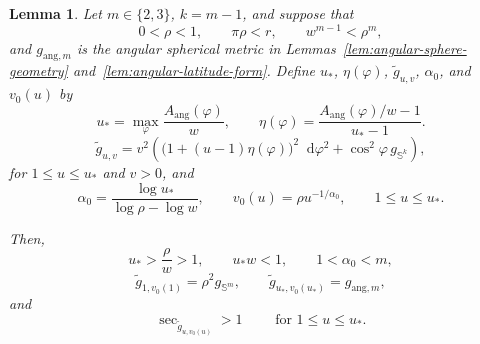 \documentclass[11pt,reqno]{amsart}
\newtheorem{lemma}[theorem]{Lemma}
\theoremstyle{definition}
\numberwithin{equation}{section}
\newcommand{\dd}{\mathop{}\!\mathrm d}
\begin{document}
\begin{lemma}\label{lem:angular-slice-interpolation}
Let \(m\in\{2,3\}\), \(k=m-1\), and suppose that
\[
 0<\rho<1,\qquad \pi\rho<r,\qquad
 w^{m-1}<\rho^m,
\]
and \(g_{\mathrm{ang},m}\) is the angular spherical metric in
Lemmas~\ref{lem:angular-sphere-geometry}
and~\ref{lem:angular-latitude-form}.  Define \(u_*\), \(\eta(\varphi)\),
\(\widetilde g_{u,v}\), $\alpha_0$, and \(v_0(u)\) by
\begin{equation}
u_*=\max_\varphi\frac{A_{\mathrm{ang}}(\varphi)}w,
 \qquad
 \eta(\varphi)
   =\frac{A_{\mathrm{ang}}(\varphi)/w-1}{u_*-1}.                  \label{eq:unified-base-3-27}
\end{equation}
\begin{equation}
\widetilde g_{u,v}
  =v^2\left(
       \bigl(1+(u-1)\eta(\varphi)\bigr)^2\dd\varphi^2
       +\cos^2\varphi\,g_{\mathbb S^k}\right),               \label{eq:unified-base-3-28}
\end{equation}
for $1\le u\le u_*$ and $v>0$, and
\begin{equation}
\alpha_0=\frac{\log u_*}{\log\rho-\log w},
 \qquad
 v_0(u)=\rho u^{-1/\alpha_0},\qquad 1\le u\le u_*.              \label{eq:unified-base-3-32}
\end{equation}

Then,
\[
 u_*>\frac{\rho}{w}>1,\qquad u_*w<1,\qquad
 1<\alpha_0<m,
\]
\[
 \widetilde g_{1,v_0(1)}=\rho^2g_{\mathbb S^m},\qquad
 \widetilde g_{u_*,v_0(u_*)}=g_{\mathrm{ang},m},
\]
and
\[
 \sec_{\widetilde g_{u,v_0(u)}}>1
 \qquad \text{ for } 1\leq u\leq u_*.
\]
\end{lemma}
\end{document}
